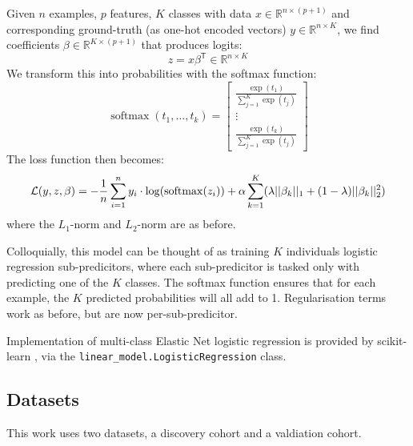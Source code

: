 \documentclass{article}
\DeclareMathOperator*{\softmax}{softmax}
\newcommand{\equationname}[1]{%
    \begingroup
        \leavevmode
        \addcontentsline{equ}{equations}{\protect\numberline{\theequation}#1}%
    \endgroup   
}
\begin{document}
Given \(n\) examples, \(p\) features, \(K\) classes with data \(x \in \mathbb{R}^{n \times (p + 1)}\) and corresponding ground-truth (as one-hot encoded vectors) \(y \in \mathbb{R}^{n \times K}\), we find coefficients \(\beta \in \mathbb{R}^{K \times (p + 1)}\) that produces logits:
\[z = x \beta^\mathsf{T} \in \mathbb{R}^{n \times K}\]
We transform this into probabilities with the softmax function:
\[\softmax(t_1,... , t_k) =
    \begin{bmatrix}
        \frac{\exp(t_1)}{\sum_{j=1}^{K} \exp(t_j)} \\
        \vdots                                     \\
        \frac{\exp(t_k)}{\sum_{j=1}^{K} \exp(t_j)}
    \end{bmatrix}
\]
The loss function then becomes:
\begin{equation} \equationname{Elastic Net logistic regression}
    \mathcal{L}(y, z, \beta) = -\frac{1}{n}\sum_{i=1}^{n} y_i \cdot \log(\softmax(z_i)) + \alpha\sum_{k=1}^{K}(\lambda||\beta_k||_1 + (1 - \lambda)||\beta_k||_2^2)
\end{equation}
where the \(L_1\)-norm and \(L_2\)-norm are as before.

Colloquially, this model can be thought of as training \(K\) individuals logistic regression sub-predicitors, where each sub-predicitor is tasked only with predicting one of the \(K\) classes. The softmax function ensures that for each example, the \(K\) predicted probabilities will all add to 1. Regularisation terms work as before, but are now per-sub-predicitor.

Implementation of multi-class Elastic Net logistic regression is provided by scikit-learn \cite{scikit-learn}, via the \verb|linear_model.LogisticRegression| class.

\subsection{Datasets}
This work uses two datasets, a discovery cohort and a valdiation cohort.
\end{document}
